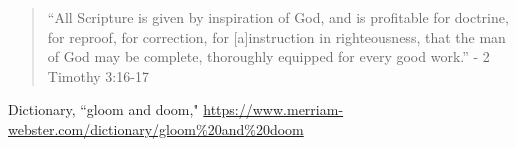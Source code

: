\documentclass[10pt]{article}
\begin{document}
\begin{multicols}{2}
\begin{quotation}
	``All Scripture is given by inspiration of God, and is profitable for doctrine, for reproof, for correction, for [a]instruction in righteousness, that the man of God may be complete, thoroughly equipped for every good work.'' - 2 Timothy 3:16-17
\end{quotation}

\begin{thebibliography}{9}
	{\footnotesize
	 Dictionary, ``gloom and doom," \url{https://www.merriam-webster.com/dictionary/gloom%20and%20doom}

	}
\end{thebibliography}

\end{multicols}


\end{document}
